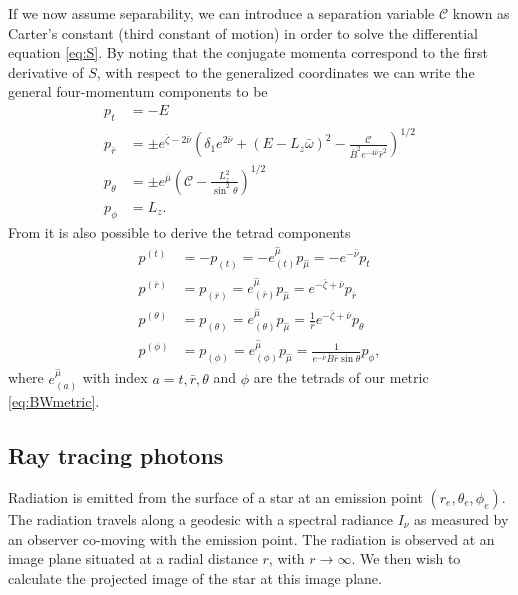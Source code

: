 \documentclass[iop, usenatbib]{emulateapj}
\makeatletter
\def\fvec#1{\underline{\sbox\tw@{$#1$}\dp\tw@\z@\box\tw@}}
\newcommand{\Ca}{\ensuremath{\mathcal{C}}}
\newcommand{\rb}{\ensuremath{\bar{r}}}
\newcommand{\wb}{\ensuremath{\bar{\omega}}}
\newcommand{\nub}{\ensuremath{\bar{\nu}}}
\newcommand{\zetab}{\ensuremath{\bar{\zeta}}}
\newcommand{\Bb}{\ensuremath{\bar{B}}}
\newcommand{\mub}{\ensuremath{\bar{\mu}}}
\makeatother
\begin{document}
If we now assume separability, we can introduce a separation variable $\Ca$ known as Carter's constant (third constant of motion) in order to solve the differential equation \eqref{eq:S}.
By noting that the conjugate momenta correspond to the first derivative of $S$, with respect to the generalized coordinates we can write the general four-momentum \fvec{p} components to be
\begin{align}
  p_t        &= -E \label{eq:p_t}\\
  p_{\rb}    &= \pm e^{\zetab - 2\nub} \left( \delta_1 e^{2\nub} + (E - L_z \wb)^2 - \frac{\Ca}{\Bb^2 e^{-4\nub} \rb^2} \right)^{1/2}\label{eq:p_r}\\
  p_{\theta} &= \pm e^{\mub} \left( \Ca - \frac{L_z^2}{\sin^2\theta} \right)^{1/2}\label{eq:p_the}\\
  p_{\phi}   &= L_z\label{eq:p_p}.
\end{align}
From \fvec{p} it is also possible to derive the tetrad components 
\begin{align}
  p^{(t)} &= -p_{(t)} = -e_{(t)}^{\hat{\mu}} p_{\hat{\mu}} = -e^{-\nub}p_t \label{eq:tetp_t}\\
  p^{(\rb)} &= p_{(\rb)} = e_{(\rb)}^{\hat{\mu}} p_{\hat{\mu}} = e^{-\zetab + \nub} p_{\rb} \label{eq:tetp_r}\\
  p^{(\theta)} &= p_{(\theta)} = e_{(\theta)}^{\hat{\mu}} p_{\hat{\mu}} = \frac{1}{\rb} e^{-\zetab+\nub} p_{\theta} \label{eq:tetp_theta}\\
  p^{(\phi)} &= p_{(\phi)} = e_{(\phi)}^{\hat{\mu}} p_{\hat{\mu}} = \frac{1}{e^{-\nub} \Bb \rb \sin\theta} p_{\phi} \label{eq:tetp_phi},
\end{align}
where $e^{\hat{\mu}}_{(a)}$ with index $a = t, \rb, \theta$ and $\phi$ are the tetrads of our metric \eqref{eq:BWmetric}.


\subsection{Ray tracing photons}
Radiation is emitted from the surface of a star at an emission point $(r_e,\theta_e,\phi_e)$. 
The radiation travels along a geodesic with a spectral radiance $I_{\nu}$ as measured by an observer co-moving with the emission point.
The radiation is observed at an image plane situated at a radial distance $r$, with $r\rightarrow\infty$.
We then wish to calculate the projected image of the star at this image plane.
\end{document}

